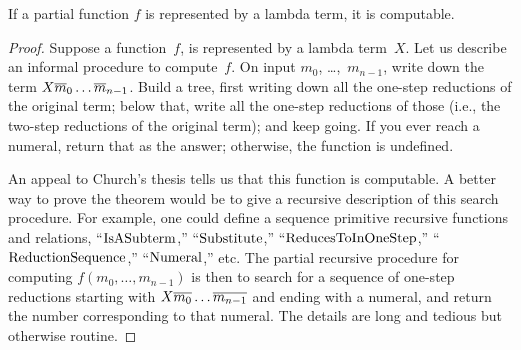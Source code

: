 \documentclass[../../include/open-logic-section]{subfiles}
\begin{document}

\begin{thm}
If a partial function $f$ is represented by a lambda term, it is
computable.
\end{thm}

\begin{proof}
Suppose a function~$f$, is represented by a lambda term~$X$. Let us
describe an informal procedure to compute~$f$. On input $m_0$,
\dots,~$m_{n-1}$, write down the term $X \overline{m}_0 \ldots \overline{m}_{n-1}$. Build a tree, first writing down all the one-step reductions
of the original term; below that, write all the one-step reductions of
those (i.e., the two-step reductions of the original term); and keep
going. If you ever reach a numeral, return that as the answer;
otherwise, the function is undefined.

An appeal to Church's thesis tells us that this function is
computable. A better way to prove the theorem would be to give a
recursive description of this search procedure. For example, one
could define a sequence primitive recursive functions and relations,
``$\mathrm{IsASubterm}$,'' ``$\mathrm{Substitute}$,''
``$\mathrm{ReducesToInOneStep}$,'' ``$\mathrm{ReductionSequence}$,''
``$\mathrm{Numeral}$,'' etc. The partial recursive procedure for computing
$f(m_0, \dots, m_{n-1})$ is then to search for a sequence of one-step
reductions starting with $X \overline{m_0} \dots \overline{m_{n-1}}$ and ending
with a numeral, and return the number corresponding to that numeral.
The details are long and tedious but otherwise routine.
\end{proof}
\end{document}

